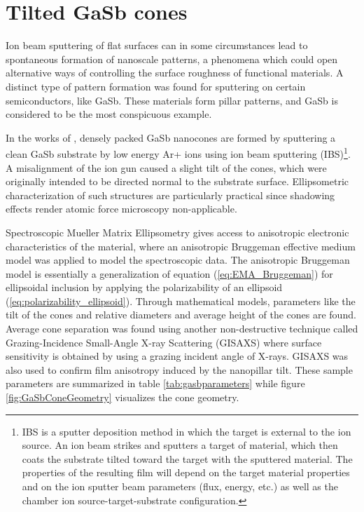 \section{Tilted GaSb cones}
Ion beam sputtering of flat surfaces can in some circumstances lead to spontaneous formation of nanoscale patterns, a phenomena which could open alternative ways of controlling the surface roughness of functional materials\cite{Nerbo_insituFormationGasb}. A distinct type of pattern formation was found for sputtering on certain semiconductors, like GaSb. These materials form pillar patterns, and GaSb is considered to be the most conspicuous example\cite{Nerbo_insituFormationGasb}.

In the works of \cite{gasbcones}, densely packed GaSb nanocones are formed by sputtering a clean GaSb substrate by low energy Ar+ ions using ion beam sputtering (IBS)\footnote{IBS is a sputter deposition method in which the target is external to the ion source. An ion beam strikes and sputters a target of material, which then coats the substrate tilted toward the target with the sputtered material. The properties of the resulting film will depend on the target material properties and on the ion sputter beam parameters (flux, energy, etc.) as well as the chamber ion source-target-substrate configuration.}. A misalignment of the ion gun caused a slight tilt of the cones, which were originally intended to be directed normal to the substrate surface\cite{gasbcones}. Ellipsometric characterization of such structures are particularly practical since shadowing effects render atomic force microscopy non-applicable\cite{Nerbo_inclinedGasb}.





Spectroscopic Mueller Matrix Ellipsometry gives access to anisotropic electronic characteristics of the material, where an anisotropic Bruggeman effective medium model was applied to model the spectroscopic data. The anisotropic Bruggeman model is essentially a generalization of equation (\ref{eq:EMA_Bruggeman}) for ellipsoidal inclusion by applying the polarizability of an ellipsoid (\ref{eq:polarizability_ellipsoid}). Through mathematical models, parameters like the tilt of the cones and relative diameters and average height of the cones are found\cite{gasbcones}. Average cone separation was found using another non-destructive technique called Grazing-Incidence Small-Angle X-ray Scattering (GISAXS) where surface sensitivity is obtained by using a grazing incident angle of X-rays\cite{gasbcones}. GISAXS was also used to confirm film anisotropy induced by the nanopillar tilt\cite{gasbcones}. These sample parameters are summarized in table \ref{tab:gasbparameters} while figure \ref{fig:GaSbConeGeometry} visualizes the cone geometry.

